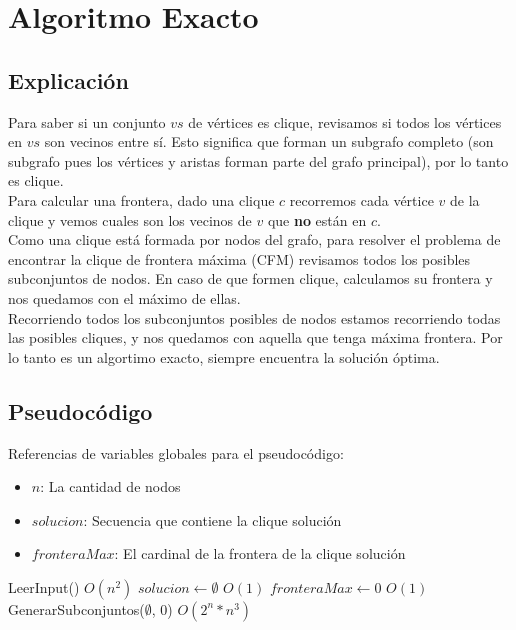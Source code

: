 
\section{Algoritmo Exacto}

\subsection{Explicación}
Para saber si un conjunto $vs$ de vértices es clique, revisamos si todos los vértices en $vs$ son vecinos entre sí.
Esto significa que forman un subgrafo completo (son subgrafo pues los vértices y aristas forman parte del grafo principal), por lo tanto es clique. \\

Para calcular una frontera, dado una clique $c$ recorremos cada vértice $v$ de la clique y vemos cuales son los vecinos de $v$ que \textbf{no} están en $c$. \\

Como una clique está formada por nodos del grafo, para resolver el problema de encontrar la clique de frontera máxima (CFM) revisamos todos los posibles subconjuntos de nodos. En caso de que formen clique, calculamos su frontera y nos quedamos con el máximo de ellas. \\

Recorriendo todos los subconjuntos posibles de nodos estamos recorriendo todas las posibles cliques, y nos quedamos con aquella que tenga máxima frontera. Por lo tanto es un algortimo exacto, siempre encuentra la solución óptima. \\

\subsection{Pseudocódigo}

Referencias de variables globales para el pseudocódigo:
\begin{itemize}
    \item $n$: La cantidad de nodos
    \item $solucion$: Secuencia que contiene la clique solución
    \item $fronteraMax$: El cardinal de la frontera de la clique solución
\end{itemize}

\begin{algorithm}[H]
\begin{algorithmic}
    \State LeerInput()                  \Comment $O(n^2)$
    \State $solucion \gets \emptyset$   \Comment $O(1)$
    \State $fronteraMax \gets 0$        \Comment $O(1)$
    \State GenerarSubconjuntos($\emptyset$, $0$) \Comment $O(2^{n} * n^{3})$
\EndFunction
\end{algorithmic}
\end{algorithm}


